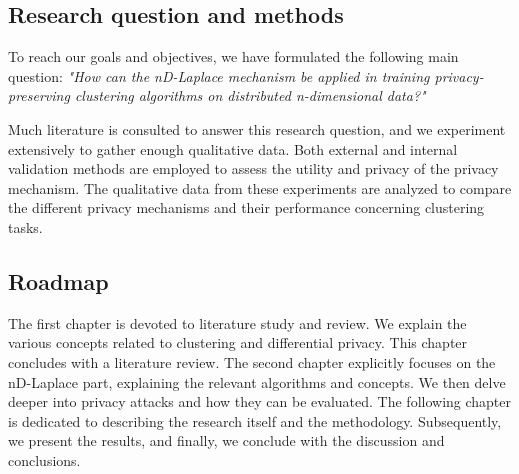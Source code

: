 \subsection*{Research question and methods}
To reach our goals and objectives, we have formulated the following main question: \newline \newline
\textit{"How can the nD-Laplace mechanism be applied in training privacy-preserving clustering algorithms on distributed n-dimensional data?"} \newline

{Much literature is consulted to answer this research question, and we experiment extensively to gather enough qualitative data. Both external and internal validation methods are employed to assess the utility and privacy of the privacy mechanism. The qualitative data from these experiments are analyzed to compare the different privacy mechanisms and their performance concerning clustering tasks.}

\subsection*{Roadmap}
The first chapter is devoted to literature study and review.
We explain the various concepts related to clustering and differential privacy.
This chapter concludes with a literature review.
The second chapter explicitly focuses on the nD-Laplace part, explaining the relevant algorithms and concepts.
We then delve deeper into privacy attacks and how they can be evaluated. \newline
The following chapter is dedicated to describing the research itself and the methodology.
Subsequently, we present the results, and finally, we conclude with the discussion and conclusions.


